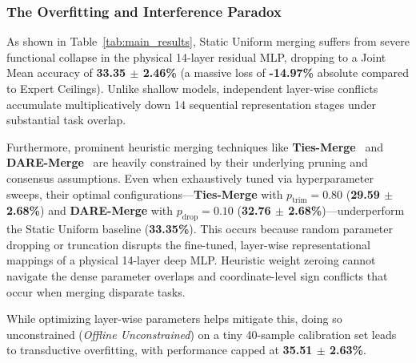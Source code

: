 \subsubsection{The Overfitting and Interference Paradox}
As shown in Table~\ref{tab:main_results}, Static Uniform merging suffers from severe functional collapse in the physical 14-layer residual MLP, dropping to a Joint Mean accuracy of \textbf{33.35 $\pm$ 2.46\%} (a massive loss of \textbf{-14.97\%} absolute compared to Expert Ceilings). Unlike shallow models, independent layer-wise conflicts accumulate multiplicatively down 14 sequential representation stages under substantial task overlap.

Furthermore, prominent heuristic merging techniques like \textbf{Ties-Merge}~\cite{yadav2023ties} and \textbf{DARE-Merge}~\cite{yu2023dare} are heavily constrained by their underlying pruning and consensus assumptions. Even when exhaustively tuned via hyperparameter sweeps, their optimal configurations—\textbf{Ties-Merge} with $p_{\text{trim}} = 0.80$ (\textbf{29.59 $\pm$ 2.68\%}) and \textbf{DARE-Merge} with $p_{\text{drop}} = 0.10$ (\textbf{32.76 $\pm$ 2.68\%})—underperform the Static Uniform baseline (\textbf{33.35\%}). This occurs because random parameter dropping or truncation disrupts the fine-tuned, layer-wise representational mappings of a physical 14-layer deep MLP. Heuristic weight zeroing cannot navigate the dense parameter overlaps and coordinate-level sign conflicts that occur when merging disparate tasks.

While optimizing layer-wise parameters helps mitigate this, doing so unconstrained (\emph{Offline Unconstrained}) on a tiny 40-sample calibration set leads to transductive overfitting, with performance capped at \textbf{35.51 $\pm$ 2.63\%}.


